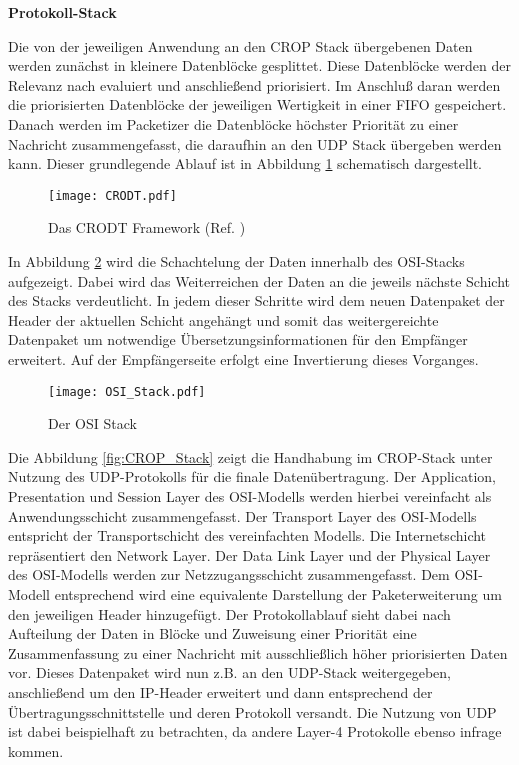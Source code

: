 \textbf{Protokoll-Stack} \label{sec:Konzept_Protocolstack}

Die von der jeweiligen Anwendung an den \gls{CROP} Stack {\"u}bergebenen Daten
werden zun{\"a}chst in kleinere Datenbl{\"o}cke gesplittet. Diese Datenbl{\"o}cke
werden der Relevanz nach evaluiert und anschlie{\ss}end priorisiert.
Im Anschlu{\ss} daran werden die priorisierten Datenbl{\"o}cke der jeweiligen
Wertigkeit in einer \gls{FIFO} gespeichert. Danach werden im
Packetizer die Datenbl{\"o}cke h{\"o}chster Priorit{\"a}t zu einer
Nachricht zusammengefasst, die daraufhin an den \gls{UDP} Stack {\"u}bergeben
werden kann. Dieser grundlegende Ablauf ist in Abbildung \ref{fig:CRODT} schematisch
dargestellt.

\begin{figure}[H]
\centering
\texttt{[image: CRODT.pdf]}
\caption[Das CRODT Framework]{Das CRODT Framework (Ref. \cite{Daher})}
\label{fig:CRODT}
\end{figure}

In Abbildung \ref{fig:OSI_Stack} wird die Schachtelung der Daten
innerhalb des OSI-Stacks aufgezeigt. Dabei wird das Weiterreichen der Daten an
die jeweils n{\"a}chste Schicht des Stacks verdeutlicht. In jedem dieser Schritte wird dem neuen
Datenpaket der Header der aktuellen Schicht angeh{\"a}ngt und somit das
weitergereichte Datenpaket um notwendige {\"U}bersetzungsinformationen f{\"u}r
den Empf{\"a}nger erweitert. Auf der Empf{\"a}ngerseite erfolgt eine Invertierung dieses
Vorganges. 

\begin{figure}[H]
\centering
\texttt{[image: OSI\_Stack.pdf]}
\caption{Der OSI Stack}
\label{fig:OSI_Stack}
\end{figure}
 
Die Abbildung \ref{fig:CROP_Stack} zeigt die Handhabung im CROP-Stack
unter Nutzung des \gls{UDP}-Protokolls f{\"u}r die finale Daten{\"u}bertragung. Der
Application, Presentation und Session Layer des OSI-Modells
werden hierbei vereinfacht als Anwendungsschicht zusammengefasst.
Der Transport Layer des OSI-Modells entspricht der Transportschicht des
vereinfachten Modells. Die Internetschicht repr{\"a}sentiert den Network
Layer.
Der Data Link Layer und der Physical Layer des OSI-Modells werden zur
Netzzugangsschicht zusammengefasst. Dem OSI-Modell entsprechend wird eine
equivalente Darstellung der Paketerweiterung um den jeweiligen Header
hinzugef{\"u}gt. Der Protokollablauf sieht dabei nach Aufteilung der Daten in
Bl{\"o}cke und Zuweisung einer Priorit{\"a}t eine Zusammenfassung zu einer
Nachricht mit ausschließlich höher priorisierten Daten vor. Dieses Datenpaket
wird nun z.B. an den \gls{UDP}-Stack weitergegeben, anschlie{\ss}end um den
\gls{IP}-Header erweitert und dann entsprechend der
{\"U}bertragungsschnittstelle und deren Protokoll versandt. Die Nutzung von UDP
ist dabei beispielhaft zu betrachten, da andere Layer-4 Protokolle ebenso
infrage kommen.


